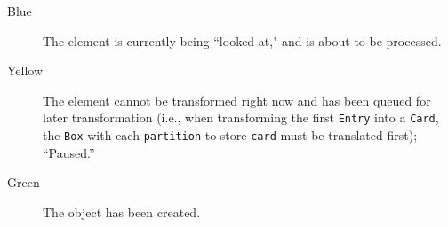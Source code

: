 \begin{itemize}
\begin{description}
  \item[Blue] The element is currently being ``looked at," and is about to be processed.
  
  \vspace{0.5cm}
  
  \item[Yellow] The element cannot be transformed right now and has been queued for later transformation (i.e., when transforming the first
  \texttt{Entry} into a \texttt{Card}, the \texttt{Box} with each \texttt{partition} to store \texttt{card} must be translated first); ``Paused.''
  
  \vspace{0.5cm}
  
  \item[Green] The object has been created.

\end{description}

\end{itemize}
